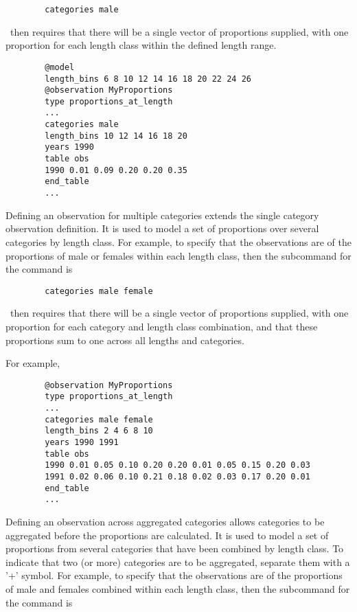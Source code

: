 {\small{\begin{verbatim}
		categories male
		\end{verbatim}}}

\CNAME\ then requires that there will be a single vector of proportions supplied, with one proportion for each length class within the defined length range.


{\small{\begin{verbatim}
		@model
		length_bins 6 8 10 12 14 16 18 20 22 24 26
		@observation MyProportions
		type proportions_at_length
		...
		categories male
		length_bins 10 12 14 16 18 20
		years 1990
		table obs
		1990 0.01 0.09 0.20 0.20 0.35 
		end_table
		...
		\end{verbatim}}}

Defining an observation for multiple categories extends the single category observation definition. It is used to model a set of proportions over several categories by length class. For example, to specify that the observations are of the proportions of male or females within each length class, then the subcommand  for the  command is

{\small{\begin{verbatim}
		categories male female
		\end{verbatim}}}

\CNAME\ then requires that there will be a single vector of proportions supplied, with one proportion for each category and length class combination, and that these proportions sum to one across all lengths and categories.

For example,

{\small{\begin{verbatim}
		@observation MyProportions
		type proportions_at_length
		...
		categories male female
		length_bins 2 4 6 8 10
		years 1990 1991
		table obs
		1990 0.01 0.05 0.10 0.20 0.20 0.01 0.05 0.15 0.20 0.03
		1991 0.02 0.06 0.10 0.21 0.18 0.02 0.03 0.17 0.20 0.01
		end_table
		...
		\end{verbatim}}}

Defining an observation across aggregated categories allows categories to be aggregated before the proportions are calculated. It is used to model a set of proportions from several categories that have been combined by length class. To indicate that two (or more) categories are to be aggregated, separate them with a '+' symbol. For example, to specify that the observations are of the proportions of male and females combined within each length class, then the subcommand  for the  command is

